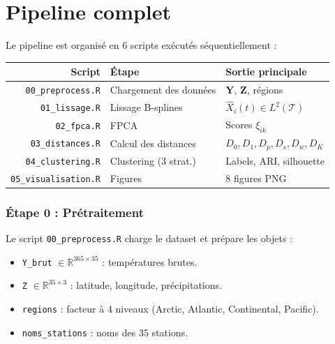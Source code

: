 \documentclass[11pt, a4paper]{article}
\newcommand{\R}{\mathbb{R}}
\newcommand{\Ltwo}{L^2(\mathcal{T})}
\newcommand{\Dp}{D_p}
\newcommand{\Dw}{D_w}
\newcommand{\DK}{D_K}
\theoremstyle{definition}
\theoremstyle{remark}
\begin{document}
\newpage
\part{Pipeline complet}

Le pipeline est organisé en 6 scripts exécutés séquentiellement :
\begin{center}
\begin{tabular}{rll}
  \toprule
  \textbf{Script} & \textbf{Étape} & \textbf{Sortie principale} \\
  \midrule
  \texttt{00\_preprocess.R} & Chargement des données & $\mathbf{Y}$, $\mathbf{Z}$, régions \\
  \texttt{01\_lissage.R}    & Lissage B-splines      & $\hat{X}_i(t) \in \Ltwo$ \\
  \texttt{02\_fpca.R}       & FPCA                   & Scores $\xi_{ik}$ \\
  \texttt{03\_distances.R}  & Calcul des distances   & $D_0, D_1, \Dp, D_s, \Dw, \DK$ \\
  \texttt{04\_clustering.R} & Clustering (3 strat.)  & Labels, ARI, silhouette \\
  \texttt{05\_visualisation.R} & Figures              & 8 figures PNG \\
  \bottomrule
\end{tabular}
\end{center}

\section{Étape 0 : Prétraitement}
\label{sec:preprocess}

Le script \texttt{00\_preprocess.R} charge le dataset et prépare les objets :

\begin{itemize}[nosep]
  \item \texttt{Y\_brut} $\in \R^{365 \times 35}$ : températures brutes.
  \item \texttt{Z} $\in \R^{35 \times 3}$ : latitude, longitude, précipitations.
  \item \texttt{regions} : facteur à 4 niveaux (Arctic, Atlantic, Continental, Pacific).
  \item \texttt{noms\_stations} : noms des 35 stations.
\end{itemize}
\end{document}
